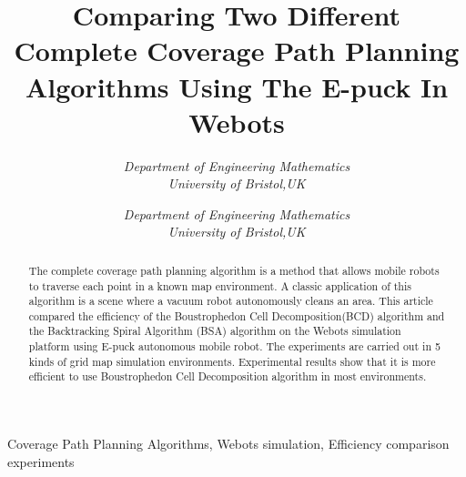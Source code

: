 \documentclass[conference]{IEEEtran}
\begin{document}
\title{Comparing Two Different Complete Coverage Path Planning Algorithms Using The E-puck In Webots}

\author{
  \textit{Department of Engineering Mathematics}\\
  \textit{University of Bristol,UK}

  \and
  \textit{Department of Engineering Mathematics}\\
  \textit{University of Bristol,UK}
  
}

\maketitle

\begin{abstract}

The complete coverage path planning algorithm is a method that allows mobile robots to traverse each point in a known map environment. A classic application of this algorithm is a scene where a vacuum robot autonomously cleans an area. This article compared the efficiency of the Boustrophedon  Cell  Decomposition(BCD) algorithm and the Backtracking Spiral Algorithm (BSA) algorithm on the Webots simulation platform using E-puck autonomous mobile robot. The experiments are carried out in 5 kinds of grid map simulation environments. Experimental results show that it is more efficient to use Boustrophedon Cell Decomposition algorithm in most environments.

\end{abstract}

\def\IEEEkeywordsname{Keywords} 
\begin{IEEEkeywords} Coverage  Path  Planning Algorithms, Webots simulation, Efficiency comparison experiments 
\end{IEEEkeywords} 
\end{document}
